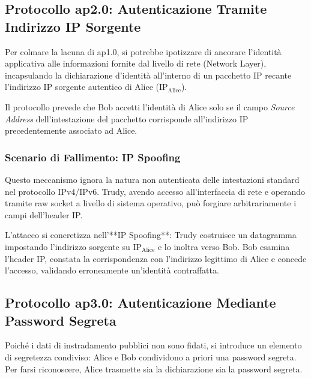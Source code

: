 \documentclass[11pt, a4paper]{article}
\begin{document}
\subsection{Protocollo ap2.0: Autenticazione Tramite Indirizzo IP Sorgente}

Per colmare la lacuna di ap1.0, si potrebbe ipotizzare di ancorare l'identità applicativa alle informazioni fornite dal livello di rete (Network Layer), incapsulando la dichiarazione d'identità all'interno di un pacchetto IP recante l'indirizzo IP sorgente autentico di Alice ($\text{IP}_{\text{Alice}}$).


Il protocollo prevede che Bob accetti l'identità di Alice solo se il campo \emph{Source Address} dell'intestazione del pacchetto corrisponde all'indirizzo IP precedentemente associato ad Alice.

\subsubsection{Scenario di Fallimento: IP Spoofing}
Questo meccanismo ignora la natura non autenticata delle intestazioni standard nel protocollo IPv4/IPv6. Trudy, avendo accesso all'interfaccia di rete e operando tramite raw socket a livello di sistema operativo, può forgiare arbitrariamente i campi dell'header IP.


L'attacco si concretizza nell'**IP Spoofing**: Trudy costruisce un datagramma impostando l'indirizzo sorgente su $\text{IP}_{\text{Alice}}$ e lo inoltra verso Bob. Bob esamina l'header IP, constata la corrispondenza con l'indirizzo legittimo di Alice e concede l'accesso, validando erroneamente un'identità contraffatta.

\subsection{Protocollo ap3.0: Autenticazione Mediante Password Segreta}

Poiché i dati di instradamento pubblici non sono fidati, si introduce un elemento di segretezza condiviso: Alice e Bob condividono a priori una password segreta. Per farsi riconoscere, Alice trasmette sia la dichiarazione sia la password segreta.
\end{document}
